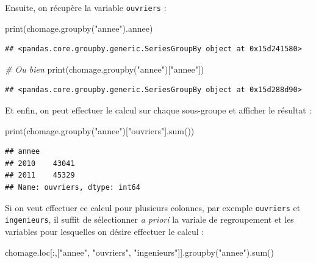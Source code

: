 \documentclass[
  12pt,
]{book}
\newenvironment{Shaded}{\begin{snugshade}}{\end{snugshade}}
\newcommand{\BuiltInTok}[1]{#1}
\newcommand{\CommentTok}[1]{\textcolor[rgb]{0.56,0.35,0.01}{\textit{#1}}}
\newcommand{\NormalTok}[1]{#1}
\newcommand{\StringTok}[1]{\textcolor[rgb]{0.31,0.60,0.02}{#1}}
\numberwithin{equation}{section}
\numberwithin{countremarque}{section}
\begin{document}
Ensuite, on récupère la variable \texttt{ouvriers} :

\begin{Shaded}
\begin{Highlighting}[]
\BuiltInTok{print}\NormalTok{(chomage.groupby(}\StringTok{"annee"}\NormalTok{).annee)}
\end{Highlighting}
\end{Shaded}

\begin{lstlisting}
## <pandas.core.groupby.generic.SeriesGroupBy object at 0x15d241580>
\end{lstlisting}

\begin{Shaded}
\begin{Highlighting}[]
\CommentTok{\# Ou bien}
\BuiltInTok{print}\NormalTok{(chomage.groupby(}\StringTok{"annee"}\NormalTok{)[}\StringTok{"annee"}\NormalTok{])}
\end{Highlighting}
\end{Shaded}

\begin{lstlisting}
## <pandas.core.groupby.generic.SeriesGroupBy object at 0x15d288d90>
\end{lstlisting}

Et enfin, on peut effectuer le calcul sur chaque sous-groupe et afficher le résultat :

\begin{Shaded}
\begin{Highlighting}[]
\BuiltInTok{print}\NormalTok{(chomage.groupby(}\StringTok{"annee"}\NormalTok{)[}\StringTok{"ouvriers"}\NormalTok{].}\BuiltInTok{sum}\NormalTok{())}
\end{Highlighting}
\end{Shaded}

\begin{lstlisting}
## annee
## 2010    43041
## 2011    45329
## Name: ouvriers, dtype: int64
\end{lstlisting}

Si on veut effectuer ce calcul pour plusieurs colonnes, par exemple \texttt{ouvriers} et \texttt{ingenieurs}, il suffit de sélectionner \emph{a priori} la variale de regroupement et les variables pour lesquelles on désire effectuer le calcul :

\begin{Shaded}
\begin{Highlighting}[]
\NormalTok{chomage.loc[:,[}\StringTok{"annee"}\NormalTok{, }\StringTok{"ouvriers"}\NormalTok{, }\StringTok{"ingenieurs"}\NormalTok{]].groupby(}\StringTok{"annee"}\NormalTok{).}\BuiltInTok{sum}\NormalTok{()}
\end{Highlighting}
\end{Shaded}
\end{document}

